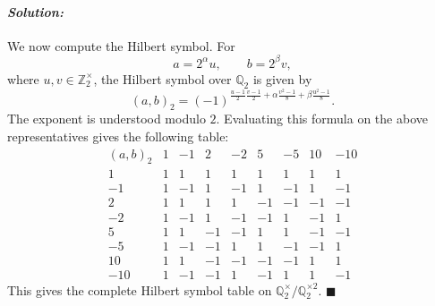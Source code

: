 \documentclass[12pt, a4paper]{article}
\newenvironment{solution}
  {\paragraph{\textit{Solution:}}\par\medskip}
  {\hfill$\blacksquare$\vspace{0.1cm}}
\begin{document}
\begin{solution}
We now compute the Hilbert symbol. For
\[
a=2^\alpha u,\qquad b=2^\beta v,
\]
where \(u,v\in\mathbb Z_2^\times\), the Hilbert symbol over \(\mathbb Q_2\) is
given by
\[
(a,b)_2
=
(-1)^{
\frac{u-1}{2}\frac{v-1}{2}
+\alpha\frac{v^2-1}{8}
+\beta\frac{u^2-1}{8}
}.
\]
The exponent is understood modulo \(2\). Evaluating this formula on the above
representatives gives the following table:
\[
\begin{array}{c|rrrrrrrr}
(a,b)_2
& 1 & -1 & 2 & -2 & 5 & -5 & 10 & -10\\
\hline
1
& 1 & 1 & 1 & 1 & 1 & 1 & 1 & 1\\
-1
& 1 & -1 & 1 & -1 & 1 & -1 & 1 & -1\\
2
& 1 & 1 & 1 & 1 & -1 & -1 & -1 & -1\\
-2
& 1 & -1 & 1 & -1 & -1 & 1 & -1 & 1\\
5
& 1 & 1 & -1 & -1 & 1 & 1 & -1 & -1\\
-5
& 1 & -1 & -1 & 1 & 1 & -1 & -1 & 1\\
10
& 1 & 1 & -1 & -1 & -1 & -1 & 1 & 1\\
-10
& 1 & -1 & -1 & 1 & -1 & 1 & 1 & -1
\end{array}
\]
This gives the complete Hilbert symbol table on
\(\mathbb Q_2^\times/\mathbb Q_2^{\times 2}\).
\end{solution}
\end{document}
